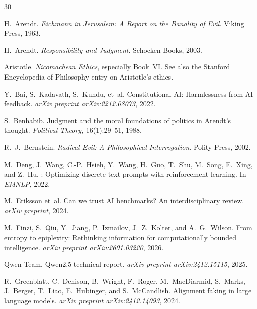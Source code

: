 \documentclass[preprint]{article}
\begin{document}
\begin{thebibliography}{30}

H.~Arendt.
\newblock \emph{Eichmann in Jerusalem: A Report on the Banality of Evil}.
\newblock Viking Press, 1963.

H.~Arendt.
\newblock \emph{Responsibility and Judgment}.
\newblock Schocken Books, 2003.

Aristotle.
\newblock \emph{Nicomachean Ethics}, especially Book~VI.
\newblock See also the Stanford Encyclopedia of Philosophy entry on Aristotle's ethics.

Y.~Bai, S.~Kadavath, S.~Kundu, et~al.
\newblock Constitutional {AI}: Harmlessness from {AI} feedback.
\newblock \emph{arXiv preprint arXiv:2212.08073}, 2022.

S.~Benhabib.
\newblock Judgment and the moral foundations of politics in {A}rendt's thought.
\newblock \emph{Political Theory}, 16(1):29--51, 1988.

R.~J.~Bernstein.
\newblock \emph{Radical Evil: A Philosophical Interrogation}.
\newblock Polity Press, 2002.

M.~Deng, J.~Wang, C.-P.~Hsieh, Y.~Wang, H.~Guo, T.~Shu, M.~Song, E.~Xing, and Z.~Hu.
: Optimizing discrete text prompts with reinforcement learning.
\newblock In \emph{EMNLP}, 2022.

M.~Eriksson et~al.
\newblock Can we trust {AI} benchmarks? {A}n interdisciplinary review.
\newblock \emph{arXiv preprint}, 2024.

M.~Finzi, S.~Qiu, Y.~Jiang, P.~Izmailov, J.~Z.~Kolter, and A.~G.~Wilson.
\newblock From entropy to epiplexity: Rethinking information for computationally bounded intelligence.
\newblock \emph{arXiv preprint arXiv:2601.03220}, 2026.

Qwen Team.
\newblock Qwen2.5 technical report.
\newblock \emph{arXiv preprint arXiv:2412.15115}, 2025.

R.~Greenblatt, C.~Denison, B.~Wright, F.~Roger, M.~MacDiarmid, S.~Marks, J.~Berger, T.~Liao, E.~Hubinger, and S.~McCandlish.
\newblock Alignment faking in large language models.
\newblock \emph{arXiv preprint arXiv:2412.14093}, 2024.


\end{thebibliography}
\end{document}

